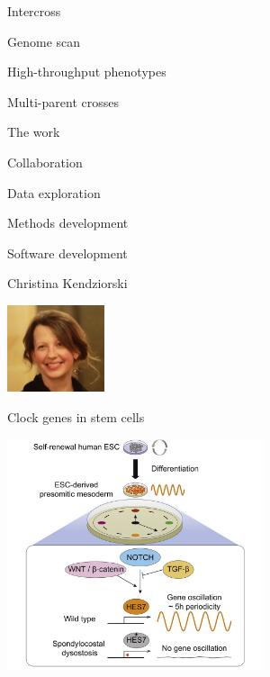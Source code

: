 \documentclass[12pt,t,aspectratio=169]{beamer}
\begin{document}
\begin{frame}{Intercross}


\end{frame}


\begin{frame}{Genome scan}


\end{frame}


\begin{frame}{High-throughput phenotypes}

\end{frame}


\begin{frame}{Multi-parent crosses}


\end{frame}



\begin{frame}{The work}

    \bbi
  \item Collaboration
  \item Data exploration
  \item Methods development
  \item Software development
    \ei

\end{frame}





\begin{frame}{Christina Kendziorski}

\hspace*{0.85\textwidth}
\includegraphics[height=1in]{Pics/kendziorski.jpeg}
\vspace*{-30mm}

{\large Clock genes in stem cells}

\bigskip

\includegraphics[height=68mm]{Pics/kendziorski_cellclock.jpg}


\end{frame}
\end{document}
